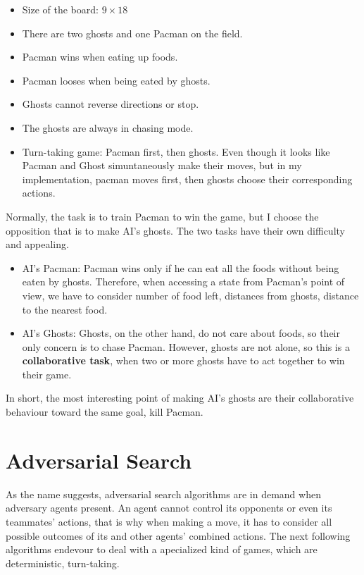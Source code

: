 \documentclass[a4paper, 11pt]{article}
\begin{document}
\begin{itemize}
\item Size of the board: $9\times 18$
\item There are two ghosts and one Pacman on the field.
\item Pacman wins when eating up foods.
\item Pacman looses when being eated by ghosts.
\item Ghosts cannot reverse directions or stop. 
\item The ghosts are always in chasing mode.
\item Turn-taking game: Pacman first, then ghosts. Even though it looks like Pacman and Ghost simuntaneously make their moves, but in my implementation, pacman moves first, then ghosts choose their corresponding actions.
\end{itemize}
Normally, the task is to train Pacman to win the game, but I choose the opposition that is to make AI's ghosts. The two tasks have their own difficulty and appealing. 
\begin{itemize} 
\item AI's Pacman: Pacman wins only if he can eat all the foods without being eaten by ghosts. Therefore, when accessing a state from Pacman's point of view, we have to consider number of food left, distances from ghosts, distance to the nearest food.
\item AI's Ghosts: Ghosts, on the other hand, do not care about foods, so their only concern is to chase Pacman. However, ghosts are not alone, so this is a \textbf{collaborative task}, when two or more ghosts have to act together to win their game.
\end{itemize}
In short, the most interesting point of making AI's ghosts are their collaborative behaviour toward the same goal, kill Pacman.
\newpage
\section{Adversarial Search}
As the name suggests, adversarial search algorithms are in demand when adversary agents present. An agent cannot control its opponents or even its teammates' actions, that is why when making a move, it has to consider all possible outcomes of its and other agents' combined actions. The next following algorithms endevour to deal with a apecialized kind of games, which are deterministic, turn-taking.
\end{document}
